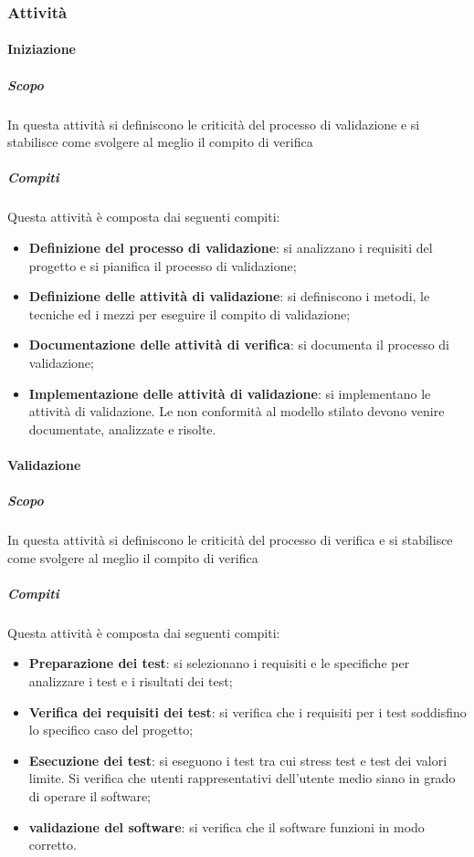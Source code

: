 \subsubsection{Attività}

\paragraph{Iniziazione}
\label{par:iniziazione}
\subparagraph{Scopo}
\label{par:iniziazione:scopo}
In questa attività si definiscono le criticità del processo di validazione e si stabilisce come svolgere al meglio il compito di verifica\\
\subparagraph{Compiti}
\label{par:iniziazione:compiti}
Questa attività è composta dai seguenti compiti:
\begin{itemize}
    \item \textbf{Definizione del processo di validazione}: si analizzano i requisiti del progetto e si pianifica il processo di validazione;
    \item \textbf{Definizione delle attività di validazione}: si definiscono i metodi, le tecniche ed i mezzi per eseguire il compito di validazione;
    \item \textbf{Documentazione delle attività di verifica}: si documenta il processo di validazione;
    \item \textbf{Implementazione delle attività di validazione}: si implementano le attività di validazione. Le non conformità al modello stilato devono venire documentate, analizzate e risolte.
\end{itemize}

\paragraph{Validazione}
\label{par:validazione}
\subparagraph{Scopo}
\label{par:validazione:scopo}
In questa attività si definiscono le criticità del processo di verifica e si stabilisce come svolgere al meglio il compito di verifica\\
\subparagraph{Compiti}
\label{par:validazione:compiti}
Questa attività è composta dai seguenti compiti:
\begin{itemize}
    \item \textbf{Preparazione dei test}: si selezionano i requisiti e le specifiche per analizzare i test e i risultati dei test;
    \item \textbf{Verifica dei requisiti dei test}: si verifica che i requisiti per i test soddisfino lo specifico caso del progetto;
    \item \textbf{Esecuzione dei test}: si eseguono i test tra cui stress test e test dei valori limite. Si verifica che utenti rappresentativi dell'utente medio siano in grado di operare il software;
    \item \textbf{validazione del software}: si verifica che il software funzioni in modo corretto.
\end{itemize}

